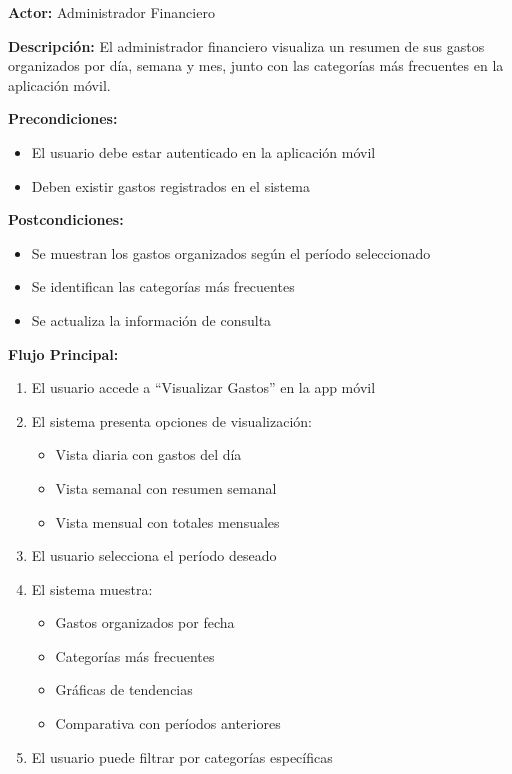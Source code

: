 \noindent\textbf{Actor:} Administrador Financiero

\noindent\textbf{Descripción:} El administrador financiero visualiza un resumen de sus gastos organizados por día, semana y mes, junto con las categorías más frecuentes en la aplicación móvil.

\noindent\textbf{Precondiciones:}
\begin{itemize}
    \item El usuario debe estar autenticado en la aplicación móvil
    \item Deben existir gastos registrados en el sistema
\end{itemize}

\noindent\textbf{Postcondiciones:}
\begin{itemize}
    \item Se muestran los gastos organizados según el período seleccionado
    \item Se identifican las categorías más frecuentes
    \item Se actualiza la información de consulta
\end{itemize}

\noindent\textbf{Flujo Principal:}
\begin{enumerate}
    \item El usuario accede a ``Visualizar Gastos'' en la app móvil
    \item El sistema presenta opciones de visualización:
    \begin{itemize}
        \item Vista diaria con gastos del día
        \item Vista semanal con resumen semanal
        \item Vista mensual con totales mensuales
    \end{itemize}
    \item El usuario selecciona el período deseado
    \item El sistema muestra:
    \begin{itemize}
        \item Gastos organizados por fecha
        \item Categorías más frecuentes
        \item Gráficas de tendencias
        \item Comparativa con períodos anteriores
    \end{itemize}
    \item El usuario puede filtrar por categorías específicas
\end{enumerate}

